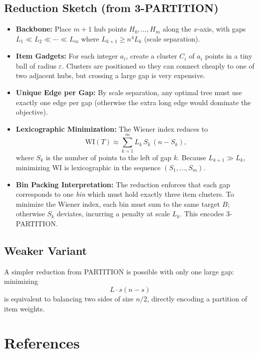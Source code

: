 \documentclass{article}
\begin{document}
\subsection{Reduction Sketch (from 3-PARTITION)}
\begin{itemize}
	\item \textbf{Backbone:} Place $m+1$ hub points $H_0,\dots,H_m$ along the $x$-axis, with gaps $L_1 \ll L_2 \ll \cdots \ll L_m$ where $L_{k+1} \ge n^4 L_k$ (scale separation).
	\item \textbf{Item Gadgets:} For each integer $a_i$, create a cluster $C_i$ of $a_i$ points in a tiny ball of radius $\varepsilon$. Clusters are positioned so they can connect cheaply to one of two adjacent hubs, but crossing a large gap is very expensive.
	\item \textbf{Unique Edge per Gap:} By scale separation, any optimal tree must use exactly one edge per gap (otherwise the extra long edge would dominate the objective).
	\item \textbf{Lexicographic Minimization:} The Wiener index reduces to
	      \[
		      \mathrm{WI}(T) \approx \sum_{k=1}^m L_k\,S_k\,(n-S_k),
	      \]
	      where $S_k$ is the number of points to the left of gap $k$. Because $L_{k+1}\gg L_k$, minimizing WI is lexicographic in the sequence $(S_1,\dots,S_m)$.
	\item \textbf{Bin Packing Interpretation:} The reduction enforces that each gap corresponds to one \emph{bin} which must hold exactly three item clusters. To minimize the Wiener index, each bin must sum to the same target $B$; otherwise $S_k$ deviates, incurring a penalty at scale $L_k$. This encodes 3-PARTITION.
\end{itemize}

\subsection{Weaker Variant}
A simpler reduction from PARTITION is possible with only one large gap: minimizing
\[
	L \cdot s(n-s)
\]
is equivalent to balancing two sides of size $n/2$, directly encoding a partition of item weights.

\section{References}
\end{document}
